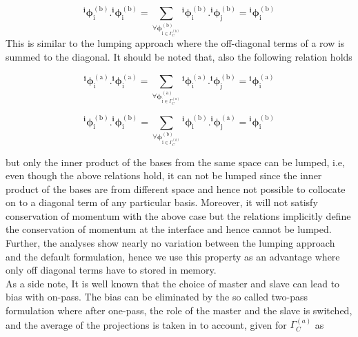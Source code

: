 \begin{equation}
{}^{\bm i} \bm \phi^{(\mathrm{b})}_{\mathrm{i}}. {}^{\bm i} \bm \phi^{(\mathrm{b})}_{\mathrm{i}} = \sum_{\forall \bm \phi^{\mathrm{(b)}}_{\mathrm{i}\in \Gamma_C^{(b)}}} {}^{\bm i} \bm \phi^{(\mathrm{b})}_{\mathrm{i}}. {}^{\bm i} \bm \phi^{(\mathrm{b})}_{\mathrm{j}} = {}^{\bm i} \bm  \phi^{\mathrm{(b)}}_{\mathrm{i}}
\end{equation}
This is similar to the lumping approach where the off-diagonal terms of a row is summed to the diagonal. 
It should be noted that, also the following relation holds

\begin{equation}\label{bases_ab}
{}^{\bm i} \bm \phi^{(\mathrm{a})}_{\mathrm{i}}. {}^{\bm i} \bm \phi^{(\mathrm{a})}_{\mathrm{i}} = \sum_{\forall \bm \phi^{\mathrm{(a)}}_{\mathrm{i}\in \Gamma_C^{(a)}}} {}^{\bm i} \bm \phi^{(\mathrm{a})}_{\mathrm{i}}. {}^{\bm i} \bm \phi^{(\mathrm{b})}_{\mathrm{j}} = {}^{\bm i} \bm  \phi^{\mathrm{(a)}}_{\mathrm{i}}
\end{equation}

\begin{equation}\label{bases_ba}
{}^{\bm i} \bm \phi^{(\mathrm{b})}_{\mathrm{i}}. {}^{\bm i} \bm \phi^{(\mathrm{b})}_{\mathrm{i}} = \sum_{\forall \bm \phi^{\mathrm{(b)}}_{\mathrm{i}\in \Gamma_C^{(b)}}} {}^{\bm i} \bm \phi^{(\mathrm{b})}_{\mathrm{i}}. {}^{\bm i} \bm \phi^{(\mathrm{a})}_{\mathrm{j}} = {}^{\bm i} \bm  \phi^{\mathrm{(b)}}_{\mathrm{i}}
\end{equation}

but only the inner product of the bases from the same space can be lumped, i.e, even though the above relations hold, it can not be lumped since the inner product of the bases are from different space and hence not possible to collocate on to a diagonal term of any particular basis. Moreover, it will not satisfy conservation of momentum with the above case but the relations implicitly define the conservation of momentum at the interface and hence cannot be lumped.
Further, the analyses show nearly no variation between the lumping approach and the default formulation, hence we use this property as an advantage where only off diagonal terms have to stored in memory.\\

As a side note, It is well known that the choice of master and slave can lead to bias with on-pass. The bias can be eliminated by the so called two-pass formulation where after one-pass, the role of the master and the slave is switched, and the average of the projections is taken in to account, given for $\Gamma_C^{(a)}$ as
 
